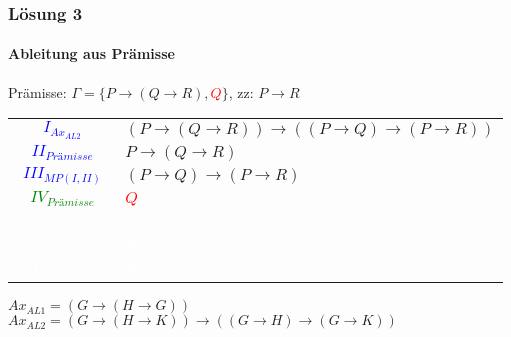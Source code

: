 \begin{frame}
	\frametitle{Lösung 3}
	\framesubtitle{Ableitung aus Prämisse}
	Prämisse: $\Gamma =\{P\rightarrow(Q\rightarrow R), $\textcolor{red}{$Q$}$\}$, zz: $P\rightarrow R$\\
	\begin{tabular}{cl}
		\textcolor{blue}{$I_{Ax_{AL2}}$}       & $(P\rightarrow(Q\rightarrow R))\rightarrow((P\rightarrow Q)\rightarrow(P\rightarrow R))$ \\
		\textcolor{blue}{$II_{Prämisse}$}      & $P\rightarrow(Q\rightarrow R)$                                                           \\
		\textcolor{blue}{$III_{MP(I, II)}$}    & $(P\rightarrow Q)\rightarrow(P\rightarrow R)$                                            \\
		\textcolor{green}{$IV_{Prämisse}$}     & \textcolor{red}{$Q$}                                                                     \\
		\textcolor{white}{$V_{IV, Ax_{AL1}}$}  & \textcolor{white}{$Q\rightarrow(P\rightarrow Q)$}                                        \\
		\textcolor{white}{$VI_{MP(IV, V)}$}    & \textcolor{white}{$P\rightarrow Q$}                                                      \\
		\textcolor{white}{$VII_{MP(III, VI)}$} & \textcolor{white}{$P\rightarrow R$}                                                      \\
	\end{tabular}
	$Ax_{AL1} = (G\rightarrow(H\rightarrow G))$\\
	$Ax_{AL2} = (G\rightarrow(H\rightarrow K))\rightarrow((G\rightarrow H)\rightarrow(G\rightarrow K))$\\
\end{frame}
